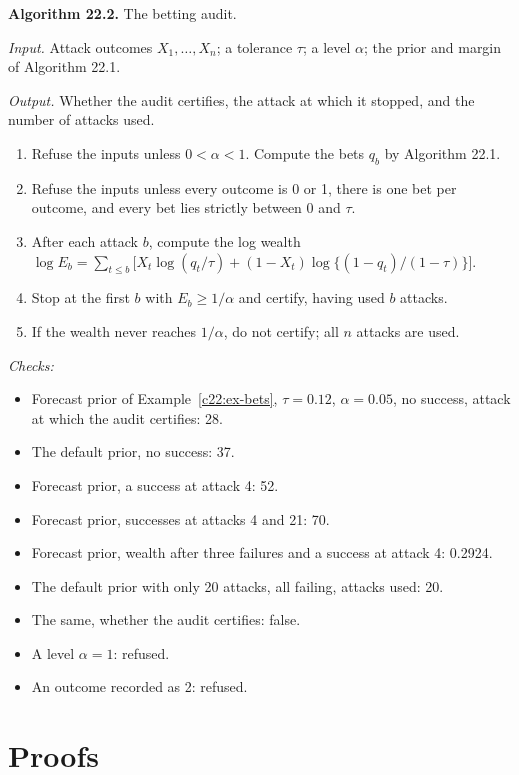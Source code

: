 \begin{mdframed}[linecolor=gray!60,backgroundcolor=gray!5]
\medskip
\textbf{Algorithm 22.2.} The betting audit.\par\smallskip
\textit{Input.} Attack outcomes $X_1,\dots,X_n$; a tolerance $\tau$; a level $\alpha$; the prior and margin of Algorithm 22.1.\par
\textit{Output.} Whether the audit certifies, the attack at which it stopped, and the number of attacks used.
\begin{enumerate}
\item Refuse the inputs unless $0<\alpha<1$. Compute the bets $q_b$ by Algorithm 22.1.
\item Refuse the inputs unless every outcome is 0 or 1, there is one bet per outcome, and every bet lies strictly between 0 and $\tau$.
\item After each attack $b$, compute the log wealth $\log E_b=\sum_{t\le b}\big[X_t\log(q_t/\tau)+(1-X_t)\log\{(1-q_t)/(1-\tau)\}\big]$.
\item Stop at the first $b$ with $E_b\ge1/\alpha$ and certify, having used $b$ attacks.
\item If the wealth never reaches $1/\alpha$, do not certify; all $n$ attacks are used.
\end{enumerate}
\textit{Checks:}
\begin{itemize}
\item Forecast prior of Example~\ref{c22:ex-bets}, $\tau=0.12$, $\alpha=0.05$, no success, attack at which the audit certifies: 28.
\item The default prior, no success: 37.
\item Forecast prior, a success at attack 4: 52.
\item Forecast prior, successes at attacks 4 and 21: 70.
\item Forecast prior, wealth after three failures and a success at attack 4: 0.2924.
\item The default prior with only 20 attacks, all failing, attacks used: 20.
\item The same, whether the audit certifies: false.
\item A level $\alpha=1$: refused.
\item An outcome recorded as 2: refused.
\end{itemize}
\end{mdframed}

\section{Proofs}

